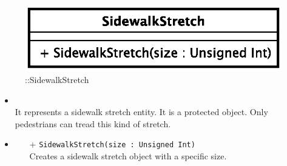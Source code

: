 \begin{figure}[h]
\centering
\includegraphics[scale=0.6,keepaspectratio]{images/solution/app/backend/sidewalk_stretch.eps}
\caption{\pReactiveComponentStretch::SidewalkStretch}
\label{fig:sd-app-sidewalk_stretch}
\end{figure}
\FloatBarrier
\begin{itemize}
  \item \textbf{\descr} \\
    It represents a sidewalk stretch entity. It is a protected object. Only pedestrians
can tread this kind of stretch.
  \item \textbf{\ops}
    \begin{itemize}
      \item[+] \texttt{SidewalkStretch(size : Unsigned Int)} \\
        Creates a sidewalk stretch object with a specific size.
    \end{itemize}
\end{itemize}
